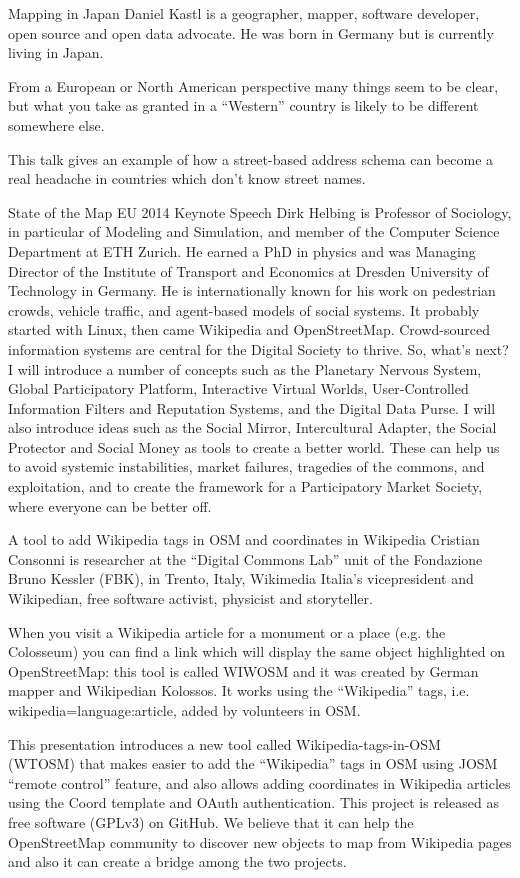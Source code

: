 %
{Mapping in Japan}%
{Daniel Kastl is a geographer, mapper, software developer, open source and open data advocate. He was born in Germany but is currently living in Japan.}%
{From a European or North American perspective many things seem to be clear, but what you take as granted in a ``Western'' country is likely to be different somewhere else.

This talk gives an example of how a street-based address schema can become a real headache in countries which don't know street names.}

%
{State of the Map EU 2014 Keynote Speech}%
{Dirk Helbing is Professor of Sociology, in particular of Modeling and 
Simulation, and member of the Computer Science Department at ETH Zurich. 
He earned a PhD in physics and was Managing Director of the Institute of 
Transport and Economics at Dresden University of Technology in Germany. 
He is internationally known for his work on pedestrian crowds, vehicle 
traffic, and agent-based models of social systems.}%
{It probably started with Linux, then came Wikipedia and OpenStreetMap. 
Crowd-sourced information systems
are central for the Digital Society to thrive. So, what's next? 
I will introduce a number of concepts such as
the Planetary Nervous System, Global Participatory Platform, 
Interactive Virtual Worlds, User-Controlled
Information Filters and Reputation Systems, and the Digital Data Purse. 
I will also introduce ideas such as the Social Mirror, 
Intercultural Adapter, 
the Social Protector and Social Money as tools to create a better world. 
These can help us to avoid systemic instabilities, market failures, 
tragedies of the commons, and exploitation, and to create the framework 
for a Participatory Market Society, where everyone can be better off.}


%
{A tool to add Wikipedia tags in OSM and coordinates in Wikipedia}%
{Cristian Consonni is researcher at the ``Digital Com\-mons Lab'' unit of the Fondazione Bruno Kessler (FBK), in Trento, Italy, Wikimedia Italia's vicepresident and Wikipedian, free software activist, physicist and storyteller.}%
{When you visit a Wikipedia article for a monument or a place (e.g. the Colosseum) you can find a link which will display the same object highlighted on OpenStreetMap: this tool is called WIWOSM and it was created by German mapper and Wikipedian Kolossos. It works using the ``Wikipedia'' tags, i.e. wikipedia=language:article, added by volunteers in OSM.

This presentation introduces a new tool called Wikipedia-tags-in-OSM (WTOSM) that makes easier to add the ``Wiki\-pedia'' tags in OSM using JOSM ``remote control'' feature, and also allows adding coordinates in Wikipedia articles using the {{Coord}} template and OAuth authentication. This project is released as free software (GPLv3) on GitHub. We believe that it can help the OpenStreetMap community to discover new objects to map from Wikipedia pages and also it can create a bridge among the two projects.}

